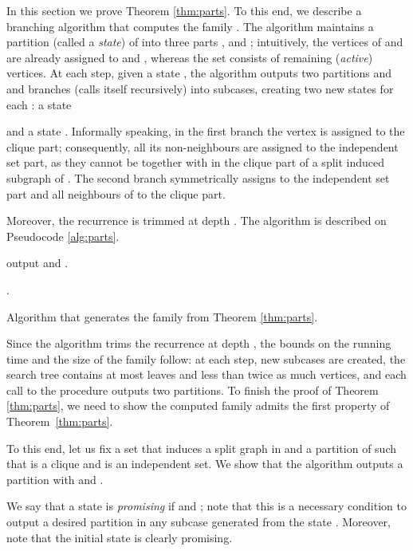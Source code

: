 \documentclass{article}
\theoremstyle{definition}
\begin{document}
In this section we prove Theorem \ref{thm:parts}.
To this end, we describe a branching algorithm that
computes the family . The algorithm
maintains a partition (called a {\em{state}}) of  into three parts ,  and ;
intuitively, the vertices of  and  are already assigned
to  and , whereas the set  consists of remaining ({\em{active}}) vertices.
At each step, given a state , the algorithm
outputs two partitions  and 
and branches (calls itself recursively) into  subcases,
creating two new states for each :
a state

and a state
.
Informally speaking, in the first branch the vertex  is assigned to the clique part; consequently,
all its non-neighbours are assigned to the independent set part, as they cannot be together with 
in the clique part of a split induced subgraph of . The second branch symmetrically assigns
 to the independent set part and all neighbours of  to the clique part.

Moreover, the recurrence is trimmed at depth .
The algorithm is described on Pseudocode \ref{alg:parts}.

\begin{algorithm}
\begin{algorithmic}[1]
\REQUIRE 
{}
\STATE output  and .
\IF{}
    \STATE 
    \STATE 
  \ENDFOR
\ENDIF

\REQUIRE 
\STATE .
\end{algorithmic}
\caption{Algorithm that generates the family  from Theorem \ref{thm:parts}.}\label{alg:parts}
\end{algorithm}

Since the algorithm trims the recurrence at depth , the bounds on the running time
and the size of the family  follow: at each step,  new subcases are created,
the search tree contains at most  leaves and less than twice as much vertices,
and each call to the procedure  outputs two partitions.
To finish the proof of Theorem \ref{thm:parts}, we need to show the computed family 
admits the first property of Theorem~\ref{thm:parts}.

To this end, let us fix a set  that induces a split graph in  and a partition 
of  such that  is a clique and  is an independent set. We show that the algorithm outputs
a partition  with  and .

We say that a state  is {\em{promising}} if  and ;
note that this is a necessary condition to output a desired partition in any subcase generated from the state .
Moreover, note that the initial state  is clearly promising.
\end{document}
